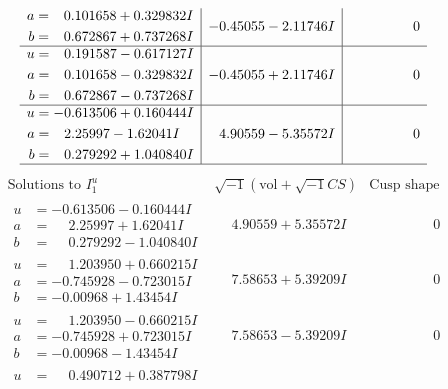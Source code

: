 \documentclass[1p]{elsarticle_modified}
\theoremstyle{definition}
\newcommand{\I}{\sqrt{-1}}
\begin{document}
$$\begin{array}{c|c|c}
\begin{aligned}
a &= \phantom{-}0.101658 + 0.329832 I \\
b &= \phantom{-}0.672867 + 0.737268 I\end{aligned}
 & -0.45055 - 2.11746 I & \phantom{-0.000000 } 0 \\ \hline\begin{aligned}
u &= \phantom{-}0.191587 - 0.617127 I \\
a &= \phantom{-}0.101658 - 0.329832 I \\
b &= \phantom{-}0.672867 - 0.737268 I\end{aligned}
 & -0.45055 + 2.11746 I & \phantom{-0.000000 } 0 \\ \hline\begin{aligned}
u &= -0.613506 + 0.160444 I \\
a &= \phantom{-}2.25997 - 1.62041 I \\
b &= \phantom{-}0.279292 + 1.040840 I\end{aligned}
 & \phantom{-}4.90559 - 5.35572 I & \phantom{-0.000000 } 0\\
 \hline 
 \end{array}$$\newpage$$\begin{array}{c|c|c}  
\text{Solutions to }I^u_{1}& \I (\text{vol} + \sqrt{-1}CS) & \text{Cusp shape}\\
 \hline 
\begin{aligned}
u &= -0.613506 - 0.160444 I \\
a &= \phantom{-}2.25997 + 1.62041 I \\
b &= \phantom{-}0.279292 - 1.040840 I\end{aligned}
 & \phantom{-}4.90559 + 5.35572 I & \phantom{-0.000000 } 0 \\ \hline\begin{aligned}
u &= \phantom{-}1.203950 + 0.660215 I \\
a &= -0.745928 - 0.723015 I \\
b &= -0.00968 + 1.43454 I\end{aligned}
 & \phantom{-}7.58653 + 5.39209 I & \phantom{-0.000000 } 0 \\ \hline\begin{aligned}
u &= \phantom{-}1.203950 - 0.660215 I \\
a &= -0.745928 + 0.723015 I \\
b &= -0.00968 - 1.43454 I\end{aligned}
 & \phantom{-}7.58653 - 5.39209 I & \phantom{-0.000000 } 0 \\ \hline\begin{aligned}
u &= \phantom{-}0.490712 + 0.387798 I \\

\end{aligned}
\end{array}$$
\end{document}
